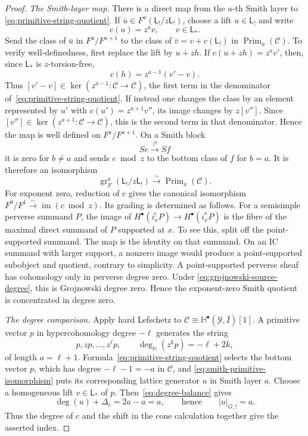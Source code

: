\documentclass[11pt]{amsart}
\theoremstyle{definition}
\theoremstyle{remark}
\begin{document}
\begin{proof}
\smallskip
\noindent\emph{The Smith-layer map.}
There is a direct map from the $a$-th Smith layer to
\eqref{eq:primitive-string-quotient}.  If
$\bar u\in F^a(\mathsf L_!/z\mathsf L_!)$, choose a lift
$u\in\mathsf L_!$ and write
\[
 c(u)=z^a v,\qquad v\in\mathsf L_*.
\]
Send the class of $\bar u$ in $F^a/F^{a+1}$ to the class of
$\bar v=v+c(\mathsf L_!)$ in $\operatorname{Prim}_a(\mathcal C)$.  To verify
well-definedness, first replace the lift by $u+zh$.  If
$c(u+zh)=z^av'$, then, since $\mathsf L_*$ is $z$-torsion-free,
\[
 c(h)=z^{a-1}(v'-v).
\]
Thus $[v'-v]\in\ker(z^{a-1}:\mathcal C\to\mathcal C)$, the first term in
the denominator of~\eqref{eq:primitive-string-quotient}.  If instead one
changes the class by an element represented by $u'$ with
$c(u')=z^{a+1}v''$, its image changes by $z[v'']$.  Since
$[v'']\in\ker(z^{a+1}:\mathcal C\to\mathcal C)$, this is the second term in
that denominator.  Hence the map is well defined on $F^a/F^{a+1}$.  On a
Smith block
\[
 S e\xrightarrow{\ z^b\ }S f
\]
it is zero for $b\ne a$ and sends $e\bmod z$ to the bottom class of $f$ for
$b=a$.  It is therefore an isomorphism
\begin{equation}\label{eq:smith-primitive-isomorphism}
 \operatorname{gr}_F^a(\mathsf L_!/z\mathsf L_!)
 \xrightarrow{\sim}\operatorname{Prim}_a(\mathcal C).
\end{equation}
For exponent zero, reduction of $c$ gives the canonical isomorphism
$F^0/F^1\xrightarrow{\sim}\operatorname{im}(c\bmod z)$.  Its grading is
determined as follows.  For a semisimple perverse summand $P$, the image of
$H^\bullet(i_x^!P)\to H^\bullet(i_x^*P)$ is the fibre of the maximal direct
summand of $P$ supported at $x$.  To see this, split off the point-supported
summand.  The map is the identity on that summand.  On an IC summand with
larger support, a nonzero image would produce a point-supported subobject and
quotient, contrary to simplicity.  A point-supported perverse sheaf has
cohomology only in perverse degree zero.  Under
\eqref{eq:grojnowski-source-degree}, this is Grojnowski degree zero.  Hence
the exponent-zero Smith quotient is concentrated in degree zero.

\smallskip
\noindent\emph{The degree comparison.}
Apply hard Lefschetz to
$\mathcal C\cong\mathbb H^\bullet(\mathcal Y,\overline I)[1]$.  A primitive
vector $p$ in hypercohomology degree $-\ell$ generates the string
\[
 p,zp,\ldots,z^\ell p,
 \qquad \deg_{\mathbb H}(z^kp)=-\ell+2k,
\]
of length $a=\ell+1$.  Formula~\eqref{eq:primitive-string-quotient} selects
the bottom vector $p$, which has degree $-\ell-1=-a$ in $\mathcal C$, and
\eqref{eq:smith-primitive-isomorphism} puts its corresponding lattice
generator $u$ in Smith layer $a$.  Choose a homogeneous lift
$v\in\mathsf L_*$ of $p$.  Then~\eqref{eq:degree-balance} gives
\[
 \deg(u)+\Delta_c=2a-a=a,
 \qquad\text{hence}\qquad |u|_{G,!}=a.
\]
Thus the degree of $c$ and the shift in the cone calculation together give
the asserted index.


\end{proof}
\end{document}
